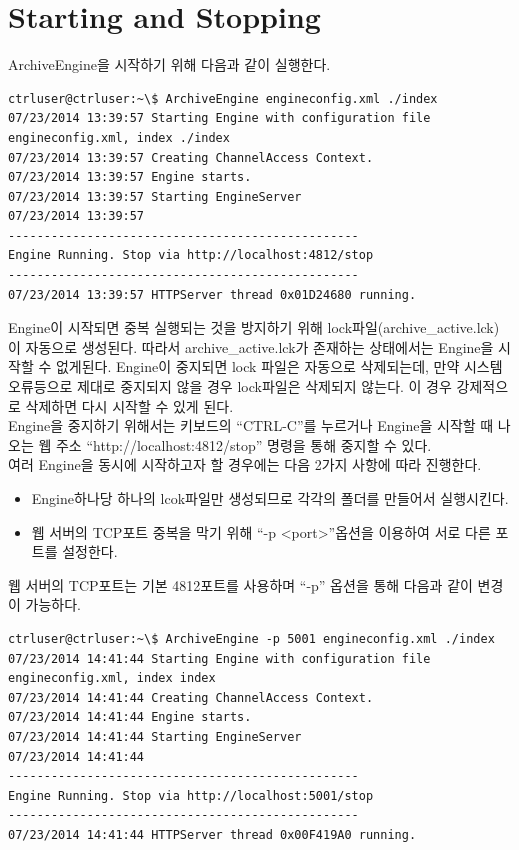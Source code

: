 \documentclass[11pt
  , a4paper
  , article
  , oneside
]{memoir}
\begin{document}
\section{Starting and Stopping}
ArchiveEngine을 시작하기 위해 다음과 같이 실행한다.
\begin{lstlisting}[style=termstyle]
ctrluser@ctrluser:~\$ ArchiveEngine engineconfig.xml ./index
07/23/2014 13:39:57 Starting Engine with configuration file engineconfig.xml, index ./index
07/23/2014 13:39:57 Creating ChannelAccess Context.
07/23/2014 13:39:57 Engine starts.
07/23/2014 13:39:57 Starting EngineServer
07/23/2014 13:39:57 
-------------------------------------------------
Engine Running. Stop via http://localhost:4812/stop
-------------------------------------------------
07/23/2014 13:39:57 HTTPServer thread 0x01D24680 running.
\end{lstlisting}
Engine이 시작되면 중복 실행되는 것을 방지하기 위해 lock파일(archive\_active.lck)이 자동으로 생성된다.
따라서 archive\_active.lck가 존재하는 상태에서는 Engine을 시작할 수 없게된다. Engine이 중지되면 lock
파일은 자동으로 삭제되는데, 만약 시스템 오류등으로 제대로 중지되지 않을 경우 lock파일은 삭제되지 않는다.
이 경우 강제적으로 삭제하면 다시 시작할 수 있게 된다.\\
Engine을 중지하기 위해서는 키보드의 ``CTRL-C''를 누르거나 Engine을 시작할 때 나오는 웹 주소
``http://localhost:4812/stop'' 명령을 통해 중지할 수 있다.\\
여러 Engine을 동시에 시작하고자 할 경우에는 다음 2가지 사항에 따라 진행한다.
\begin{itemize}
\item Engine하나당 하나의 lcok파일만 생성되므로 각각의 폴더를 만들어서 실행시킨다.
\item 웹 서버의 TCP포트 중복을 막기 위해 ``-p \textless port\textgreater''옵션을 이용하여 서로 다른 포트를 설정한다.
\end{itemize}
웹 서버의 TCP포트는 기본 4812포트를 사용하며 ``-p'' 옵션을 통해 다음과 같이 변경이 가능하다.
\begin{lstlisting}[style=termstyle]
ctrluser@ctrluser:~\$ ArchiveEngine -p 5001 engineconfig.xml ./index
07/23/2014 14:41:44 Starting Engine with configuration file engineconfig.xml, index index
07/23/2014 14:41:44 Creating ChannelAccess Context.
07/23/2014 14:41:44 Engine starts.
07/23/2014 14:41:44 Starting EngineServer
07/23/2014 14:41:44 
-------------------------------------------------
Engine Running. Stop via http://localhost:5001/stop
-------------------------------------------------
07/23/2014 14:41:44 HTTPServer thread 0x00F419A0 running.
\end{lstlisting} 
\end{document}
